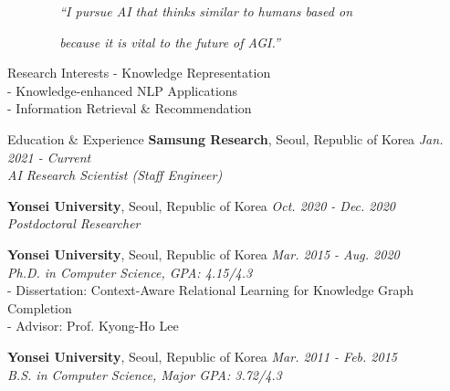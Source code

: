 \documentclass{resume} %
\newcommand{\MYhref}[3][black]{\href{#2}{\color{#1}{#3}}}%
\begin{document}
	
	\vspace{1.5em}
	{\centerline{\large\em{~~~~~~~~“I pursue AI that thinks similar to humans based on \MYhref[Blue]{http://www.overleaf.com}{\underline{knowledge}}} } }
	{\centerline{\large\em{~~~~~~~~because it is vital to the future of AGI.”}}}
	\vspace{0.5em}	

	\begin{rSection}{Research Interests}
		- Knowledge Representation\\
		- Knowledge-enhanced NLP Applications\\
		- Information Retrieval \& Recommendation
	\end{rSection}

	\begin{rSection}{Education \& Experience}
		\textbf{Samsung Research}, Seoul, Republic of Korea \hfill {\small\em Jan. 2021 - Current} 
		\\{ \textit {AI Research Scientist (Staff Engineer)}} 
		
		\textbf{Yonsei University}, Seoul, Republic of Korea \hfill {\small\em Oct. 2020 - Dec. 2020} 
		\\{ \textit {Postdoctoral Researcher}} 
		
		\textbf{Yonsei University}, Seoul, Republic of Korea \hfill {\small\em Mar. 2015 - Aug. 2020} 
		\\{ \textit {Ph.D. in Computer Science, GPA: 4.15/4.3}}\\
		- Dissertation: Context-Aware Relational Learning for Knowledge Graph Completion\\
		- Advisor: Prof. Kyong-Ho Lee
		
		\textbf{Yonsei University}, Seoul, Republic of Korea \hfill {\small\em Mar. 2011 - Feb. 2015} 
		\\{ \textit {B.S. in Computer Science, Major GPA: 3.72/4.3}} 
	\end{rSection}
\end{document}

